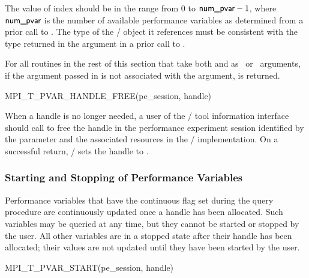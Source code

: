 The value of index should be in the range from $0$ to $\mpiarg{num\_pvar}-1$,
where $\textsf{num\_pvar}$ is the number of available performance
variables as determined from a prior call to
.  The type of the \MPI/ object it
references must be consistent with the type returned in the 
argument in a prior call to .

For all routines in the rest of this section that take both 
and  as \IN\ or \INOUT\ arguments, if the 
argument passed in is not associated with the  argument,
 is returned.

%
%
\begin{funcdef}{MPI\_T\_PVAR\_HANDLE\_FREE}{(\mbox{pe\_session}, \mbox{handle})}
\end{funcdef}

When a handle is no longer needed, a user of the \MPI/ tool information
interface should call  to free the
handle in the performance experiment session identified by the parameter  and the
associated resources in the \MPI/  implementation.  On a successful return,
\MPI/ sets the handle to .


\subsubsection{Starting and Stopping of Performance Variables}

Performance variables that have the continuous flag set during the query
procedure are continuously updated once a handle has been allocated.
Such variables may be queried at any time, but they cannot be started or
stopped by the user.  All other variables are in a stopped state after
their handle has been allocated; their values are not updated until they
have been started by the user.

\begin{funcdef}{MPI\_T\_PVAR\_START}{(\mbox{pe\_session}, \mbox{handle})}
\end{funcdef}

